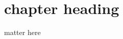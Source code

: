 \documentclass[12pt, a4paper]{report}
\begin{document}
\pagestyle{plain}
\def\title{Your Topic Here}
\def\what{IE 694: Seminar}
\def\who{Author (18534002)}
\def\guide{Prof. \ldots}

\titlpage
\tableofcontents
\listoffigures


\newpage
{}



\chapter{chapter heading}

matter here
% 
%
%
%
\end{document}
